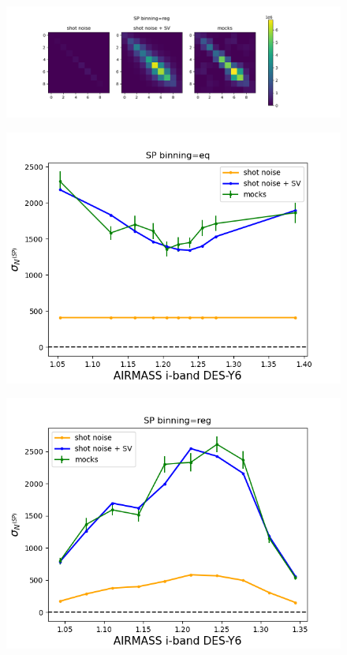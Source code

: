 \documentclass[12pt]{article}
\begin{document}
\begin{figure}[h]
    \includegraphics[width=1.2\linewidth]{../test/cov_reg.png}
    \caption{}
    \label{fig:example}
\end{figure}

\begin{figure}[h]
    \includegraphics[width=0.75\linewidth]{../test/diagonal_eq.png}
    \caption{}
    \label{fig:example}
\end{figure}

\begin{figure}[h]
    \includegraphics[width=0.75\linewidth]{../test/diagonal_reg.png}
    \caption{}
    \label{fig:example}
\end{figure}
\end{document}
